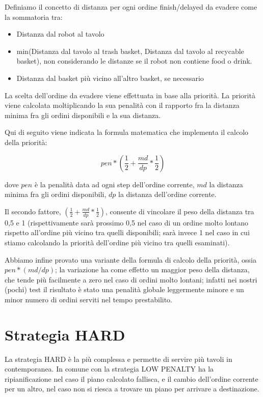 Definiamo il concetto di distanza per ogni ordine finish/delayed da evadere come la sommatoria tra:
\begin{itemize}
    \item Distanza dal robot al tavolo
    \item min(Distanza dal tavolo al trash basket, Distanza dal tavolo al recycable basket), non considerando le distanze se il robot non contiene food o drink.
    \item Distanza dal basket più vicino all'altro basket, se necessario
\end{itemize}

La scelta dell'ordine da evadere viene effettuata in base alla priorità. La priorità viene calcolata moltiplicando la sua penalità con il rapporto fra la distanza minima fra gli ordini disponibili e la sua distanza.

Qui di seguito viene indicata la formula matematica che implementa il calcolo della priorità:

$$ pen*(\frac{1}{2} + \frac{md}{dp}*\frac{1}{2}) $$

dove $pen$ è la penalità data ad ogni step dell'ordine corrente, $md$ la distanza minima fra gli ordini disponibili, $dp$ la distanza dell'ordine corrente.

Il secondo fattore, $(\frac{1}{2} + \frac{md}{dp}*\frac{1}{2})$, consente di vincolare il peso della distanza tra 0,5 e 1 (rispettivamente sarà prossimo 0,5 nel caso di un ordine molto lontano rispetto all'ordine più vicino tra quelli disponibili; sarà invece 1 nel caso in cui stiamo calcolando la priorità dell'ordine più vicino tra quelli esaminati).

Abbiamo infine provato una variante della formula di calcolo della priorità, ossia $pen*(md/dp)$; la variazione ha come effetto un maggior peso della distanza, che tende più facilmente a zero nel caso di ordini molto lontani; infatti nei nostri (pochi) test il risultato è stato una penalità globale leggermente minore e un minor numero di ordini serviti nel tempo prestabilito.

\section{Strategia HARD}
La strategia HARD è la più complessa e permette di servire più tavoli in contemporanea. In comune con la strategia LOW PENALTY ha la ripianificazione nel caso il piano calcolato fallisca, e il cambio dell'ordine corrente per un altro, nel caso non si riesca a trovare un piano per arrivare a destinazione.

